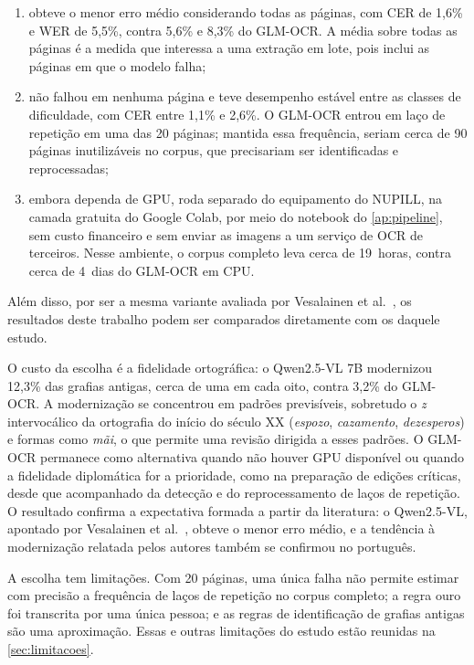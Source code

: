 \documentclass[noabntexcite,oneside]{ufsc-thesis-rn46-2019}
\begin{document}
\begin{enumerate}
    \item obteve o menor erro médio considerando todas as páginas, com CER de 1,6\% e WER
    de 5,5\%, contra 5,6\% e 8,3\% do GLM-OCR. A média sobre todas as páginas é a medida
    que interessa a uma extração em lote, pois inclui as páginas em que o modelo falha;
    \item não falhou em nenhuma página e teve desempenho estável entre as classes de
    dificuldade, com CER entre 1,1\% e 2,6\%. O GLM-OCR entrou em laço de repetição em uma
    das 20 páginas; mantida essa frequência, seriam cerca de 90 páginas inutilizáveis no
    corpus, que precisariam ser identificadas e reprocessadas;
    \item embora dependa de GPU, roda separado do equipamento do NUPILL, na camada gratuita
    do Google Colab, por meio do notebook do \autoref{ap:pipeline}, sem custo
    financeiro e sem enviar as imagens a um serviço de OCR de terceiros. Nesse ambiente, o
    corpus completo leva cerca de 19~horas, contra cerca de 4~dias do GLM-OCR em CPU.
\end{enumerate}

Além disso, por ser a mesma variante avaliada por Vesalainen et al.\
\cite{vesalainen2025}, os resultados deste trabalho podem ser comparados diretamente com
os daquele estudo.

O custo da escolha é a fidelidade ortográfica: o Qwen2.5-VL 7B modernizou 12,3\% das
grafias antigas, cerca de uma em cada oito, contra 3,2\% do GLM-OCR. A modernização se
concentrou em padrões previsíveis, sobretudo o \textit{z} intervocálico da ortografia do
início do século XX (\textit{espozo}, \textit{cazamento}, \textit{dezesperos}) e formas
como \textit{mãi}, o que permite uma revisão dirigida a esses padrões. O GLM-OCR permanece
como alternativa quando não houver GPU disponível ou quando a fidelidade diplomática for a
prioridade, como na preparação de edições críticas, desde que acompanhado da detecção e do
reprocessamento de laços de repetição. O resultado confirma a expectativa formada a partir
da literatura: o Qwen2.5-VL, apontado por Vesalainen et al.\ \cite{vesalainen2025}, obteve
o menor erro médio, e a tendência à modernização relatada pelos autores também se
confirmou no português.

A escolha tem limitações. Com 20 páginas, uma única falha não permite estimar com precisão
a frequência de laços de repetição no corpus completo; a regra ouro foi transcrita por uma única pessoa; e as regras de identificação de grafias antigas são uma aproximação.
Essas e outras limitações do estudo estão reunidas na \autoref{sec:limitacoes}.
\end{document}
